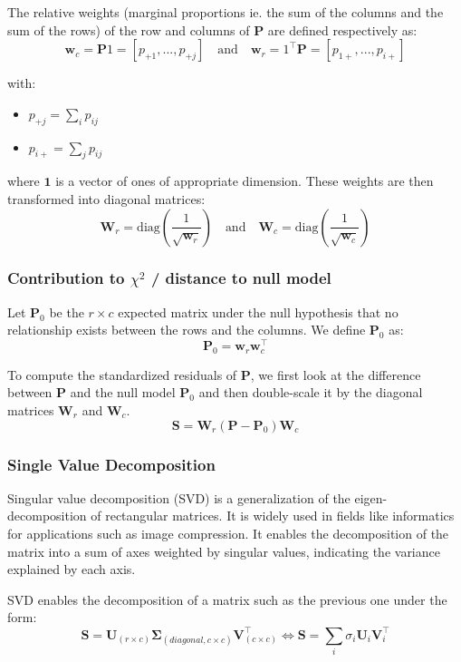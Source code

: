 The relative weights (marginal proportions ie. the sum of the columns and the sum of the rows) of the row and columns of $\mathbf{P}$ are defined respectively as: 
$$
    \mathbf{w}_c = \mathbf{P}1 = [p_{+1}, ... , p_{+j}] \quad \text{and} \quad \mathbf{w}_r = 1^\intercal\mathbf{P} = [p_{1+}, ... , p_{i+}]
$$

with:
\begin{itemize}
    \item $p_{+j} = \sum_ip_{ij}$
    \item $p_{i+} = \sum_jp_{ij}$
\end{itemize}

where \(\mathbf{1}\) is a vector of ones of appropriate dimension.
These weights are then transformed into diagonal matrices: 
$$
    \mathbf{W}_r = \text{diag}\left(\frac{1}{\sqrt{\mathbf{w}_r}}\right) \quad \text{and} \quad \mathbf{W}_c = \text{diag}\left(\frac{1}{\sqrt{\mathbf{w}_c}}\right)
$$

\subsubsection{Contribution to $\chi^2$ / distance to null model}

Let $\mathbf{P}_0$ be the $r\times c$ expected matrix under the null hypothesis that no relationship exists between the rows and the columns. We define $\mathbf{P}_0$ as:
$$
    \mathbf{P}_0 = \mathbf{w}_r \mathbf{w}_c^\intercal
$$

To compute the standardized residuals of $\mathbf{P}$, we first look at the difference between $\mathbf{P}$ and the null model $\mathbf{P}_0$ and then double-scale it by the diagonal matrices $\mathbf{W}_r$ and $\mathbf{W}_c$. 
$$
    \mathbf{S} = \mathbf{W}_r (\mathbf{P} - \mathbf{P}_0) \mathbf{W}_c
$$

\subsubsection{Single Value Decomposition}

Singular value decomposition (SVD) is a generalization of the eigen-decomposition of rectangular matrices. It is widely used in fields like informatics for applications such as image compression. It enables the decomposition of the matrix into a sum of axes weighted by singular values, indicating the variance explained by each axis.

SVD enables the decomposition of a matrix such as the previous one under the form: 
$$
    \mathbf{S} = \mathbf{U}_{(r\times c)} \mathbf{\Sigma}_{(diagonal, c\times c)} \mathbf{V}_{(c \times c)}^\intercal \Leftrightarrow \mathbf{S} = \sum_i \sigma_i \mathbf{U}_i \mathbf{V}_i^\intercal
$$

